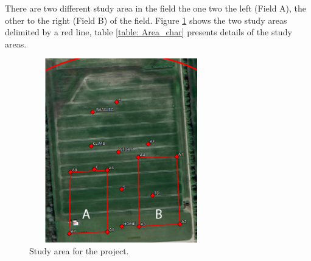 There are two different study area in the field the one two the left (Field A), the other to the right (Field B) of the field. Figure \ref{fig:Study area} shows  the two study areas delimited by a red line, table \ref{table: Area_char} presents details of the study areas.
\begin{figure}[H]
\centering
\includegraphics[width=8cm,height=8cm,keepaspectratio]{imagenes/Study_Area.png}
\caption{Study area for the project.}
\label{fig:Study area}
\end{figure}

